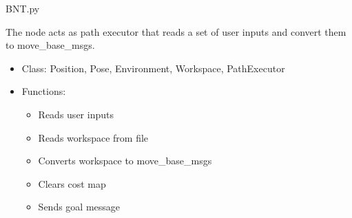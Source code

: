 \begin{frame}{BNT.py}
    
    The node acts as path executor that reads  a set of user inputs and convert them to move\_base\_msgs.
    \begin{itemize}
        \item Class: Position, Pose, Environment, Workspace, PathExecutor
        
        \item Functions:
        \begin{itemize}
        	\item Reads user inputs
        	\item Reads workspace from file
            \item Converts workspace to move\_base\_msgs
            \item Clears cost map
            \item Sends goal message
        \end{itemize}
    \end{itemize}
    
\end{frame}
